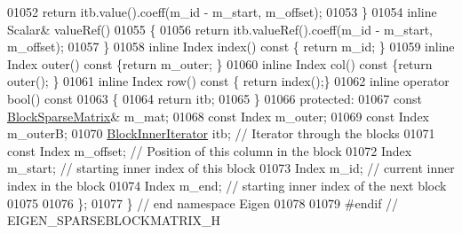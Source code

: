 \begin{DoxyCode}
01052       \textcolor{keywordflow}{return} itb.value().coeff(m\_id - m\_start, m\_offset);
01053     \}
01054     \textcolor{keyword}{inline} Scalar& valueRef()
01055     \{
01056       \textcolor{keywordflow}{return} itb.valueRef().coeff(m\_id - m\_start, m\_offset);
01057     \}
01058     \textcolor{keyword}{inline} Index index()\textcolor{keyword}{ const }\{ \textcolor{keywordflow}{return} m\_id; \}
01059     \textcolor{keyword}{inline} Index outer()\textcolor{keyword}{ const }\{\textcolor{keywordflow}{return} m\_outer; \}
01060     \textcolor{keyword}{inline} Index col()\textcolor{keyword}{ const }\{\textcolor{keywordflow}{return} outer(); \}
01061     \textcolor{keyword}{inline} Index row()\textcolor{keyword}{ const }\{ \textcolor{keywordflow}{return} index();\}
01062     \textcolor{keyword}{inline} \textcolor{keyword}{operator} bool()\textcolor{keyword}{ const}
01063 \textcolor{keyword}{    }\{
01064       \textcolor{keywordflow}{return} itb;
01065     \}
01066   \textcolor{keyword}{protected}:
01067     \textcolor{keyword}{const} \hyperlink{group___sparse_core___module_class_eigen_1_1_block_sparse_matrix}{BlockSparseMatrix}& m\_mat;
01068     \textcolor{keyword}{const} Index m\_outer;
01069     \textcolor{keyword}{const} Index m\_outerB;
01070     \hyperlink{class_eigen_1_1_block_sparse_matrix_1_1_block_inner_iterator}{BlockInnerIterator} itb; \textcolor{comment}{// Iterator through the blocks}
01071     \textcolor{keyword}{const} Index m\_offset; \textcolor{comment}{// Position of this column in the block}
01072     Index m\_start; \textcolor{comment}{// starting inner index of this block}
01073     Index m\_id; \textcolor{comment}{// current inner index in the block}
01074     Index m\_end; \textcolor{comment}{// starting inner index of the next block}
01075 
01076 \};
01077 \} \textcolor{comment}{// end namespace Eigen}
01078 
01079 \textcolor{preprocessor}{#endif // EIGEN\_SPARSEBLOCKMATRIX\_H}
\end{DoxyCode}
